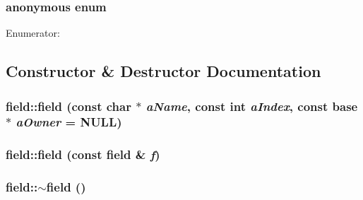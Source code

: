 \hypertarget{classfield_a1b15dba3f966736e40276ac6026f76e9}{
\subsubsection[{"@14}]{\setlength{\rightskip}{0pt plus 5cm}anonymous enum}}
\label{classfield_a1b15dba3f966736e40276ac6026f76e9}
\begin{Desc}
\item[Enumerator: ]\par
\begin{description}
\item[{\em 
\hypertarget{classfield_a1b15dba3f966736e40276ac6026f76e9a72cd17de1f06f30df4f9cd0efa5bcd0c}{
MaxWritePatches}
\label{classfield_a1b15dba3f966736e40276ac6026f76e9a72cd17de1f06f30df4f9cd0efa5bcd0c}
}]\end{description}
\end{Desc}



\subsection{Constructor \& Destructor Documentation}
\hypertarget{classfield_aba5192e37ab34e3da4561bd79c23c9ec}{
\subsubsection[{field}]{\setlength{\rightskip}{0pt plus 5cm}field::field (const char $\ast$ {\em aName}, \/  const int {\em aIndex}, \/  const {\bf base} $\ast$ {\em aOwner} = {\ttfamily NULL})}}
\label{classfield_aba5192e37ab34e3da4561bd79c23c9ec}
\hypertarget{classfield_aa173f413fc94d3ffc5aeb68d453dc700}{
\subsubsection[{field}]{\setlength{\rightskip}{0pt plus 5cm}field::field (const {\bf field} \& {\em f})}}
\label{classfield_aa173f413fc94d3ffc5aeb68d453dc700}
\hypertarget{classfield_a600cf76c8c366764a8e0e6a48e43d0fd}{
\subsubsection[{$\sim$field}]{\setlength{\rightskip}{0pt plus 5cm}field::$\sim$field ()}}
\label{classfield_a600cf76c8c366764a8e0e6a48e43d0fd}


